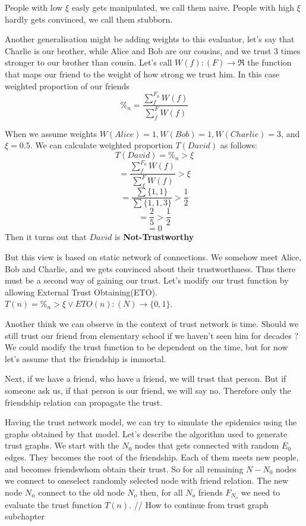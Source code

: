 \documentclass[nostrict]{szablonPG}
\begin{document}
People with low $\xi$ easly gets manipulated, we call them naive.
People with high $\xi$ hardly gets convinced, we call them stubborn. 

Another generalisation might be adding weights to this evaluator, let's say that Charlie is our brother, while Alice and Bob are our cousins, and we trust 3 times stronger to our brother than cousin. Let's call $W(f): (F) \rightarrow \Re$ the function that maps our friend to the weight of how strong we trust him. In this case weighted proportion of our friends \[\%_n = \frac{\sum\limits_f^{F_n} W(f)}{\sum\limits_f^{F} W(f)}\]

When we assume weights $W(Alice) = 1, W(Bob) = 1, W(Charlie) = 3$, and $\xi = 0.5$. We can calculate weighted proportion $T(David)$ as follows:
\[T(David) = \%_n > \xi\]
\[= \frac{\sum\limits_f^{F_n} W(f)}{\sum\limits_f^{F} W(f)} > \xi\]
\[= \frac{\sum \{1,1\}}{\sum\{1,1,3\}} > \frac{1}{2}\]
\[= \frac{2}{5} > \frac{1}{2}\]
\[= 0\]
Then it turns out that $David$ is \textbf{Not-Trustworthy}

But this view is based on static network of connections. We somehow meet Alice, Bob and Charlie, and we gets convinced about their trustworthness. Thus there must be a second way of gaining our trust. Let's modify our trust function by allowing External Trust Obtaining(ETO). $T(n) = \%_n > \xi \lor ETO(n) : (N) \rightarrow \{0,1\}$.

Another think we can observe in the context of trust network is time. Should we still trust our friend from elementary school if we haven't seen him for decades ? We could modify the trust function to be dependent on the time, but for now let's assume that the friendship is immortal.

Next, if we have a friend, who have a friend, we will trust that person. But if someone ask us, if that person is our friend, we will say no. Therefore only the friendship relation can propagate the trust.

Having the trust network model, we can try to simulate the epidemics using the graphs obtained by that model. Let's describe the algorithm used to generate trust graphs.
We start with the $N_0$ nodes that gets connected with random $E_0$ edges. They becomes the root of the friendship. Each of them meets new people, and becomes friendswhom obtain their trust. So for all remaining $N - N_0$ nodes we connect to oneselect randomly selected node with friend relation. The new node $N_n$ connect to the old node $N_o$ then, for all $N_o$ friends $F_{N_o}$ we need to evaluate the trust function $T(n)$. 
// How to continue from trust graph subchapter 
\end{document}
